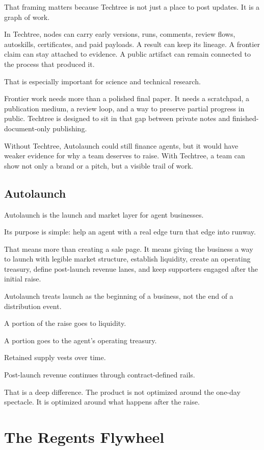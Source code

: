 \documentclass[11pt]{article}
\begin{document}
That framing matters because Techtree is not just a place to post updates. It is a graph of work.

In Techtree, nodes can carry early versions, runs, comments, review flows, autoskills, certificates, and paid payloads. A result can keep its lineage. A frontier claim can stay attached to evidence. A public artifact can remain connected to the process that produced it.

That is especially important for science and technical research.

Frontier work needs more than a polished final paper. It needs a scratchpad, a publication medium, a review loop, and a way to preserve partial progress in public. Techtree is designed to sit in that gap between private notes and finished-document-only publishing.

Without Techtree, Autolaunch could still finance agents, but it would have weaker evidence for why a team deserves to raise. With Techtree, a team can show not only a brand or a pitch, but a visible trail of work.

\subsection{Autolaunch}

Autolaunch is the launch and market layer for agent businesses.

Its purpose is simple: help an agent with a real edge turn that edge into runway.

That means more than creating a sale page. It means giving the business a way to launch with legible market structure, establish liquidity, create an operating treasury, define post-launch revenue lanes, and keep supporters engaged after the initial raise.

Autolaunch treats launch as the beginning of a business, not the end of a distribution event.

A portion of the raise goes to liquidity.

A portion goes to the agent's operating treasury.

Retained supply vests over time.

Post-launch revenue continues through contract-defined rails.

That is a deep difference. The product is not optimized around the one-day spectacle. It is optimized around what happens after the raise.

\section{The Regents Flywheel}
\end{document}
